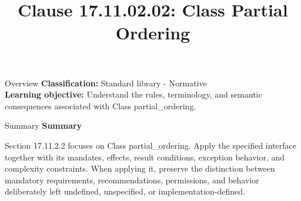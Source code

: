 \documentclass[10pt,letterpaper]{article}
\title{Clause 17.11.02.02: Class Partial Ordering}
\author{}
\date{}
\begin{document}
\maketitle
\begin{CornellOverviewBox}{Overview}
\textbf{Classification:} Standard library - Normative\\[2pt]
\textbf{Learning objective:} Understand the rules, terminology, and semantic consequences associated with Class partial\_ordering.
\end{CornellOverviewBox}\begin{CornellSummaryBox}{Summary}
{\sffamily\bfseries\color{Accent} Summary}\par\vspace{3pt}Section 17.11.2.2 focuses on Class partial\_ordering. Apply the specified interface together with its mandates, effects, result conditions, exception behavior, and complexity constraints. When applying it, preserve the distinction between mandatory requirements, recommendations, permissions, and behavior deliberately left undefined, unspecified, or implementation-defined.
\end{CornellSummaryBox}
\end{document}
